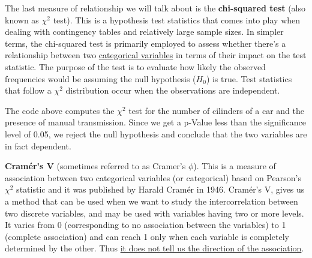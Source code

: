\documentclass[
]{svmono}
\newenvironment{Shaded}{\begin{snugshade}}{\end{snugshade}}
\newcommand{\CommentTok}[1]{\textcolor[rgb]{0.56,0.35,0.01}{\textit{#1}}}
\newcommand{\FunctionTok}[1]{\textcolor[rgb]{0.13,0.29,0.53}{\textbf{#1}}}
\newcommand{\NormalTok}[1]{#1}
\newcommand{\SpecialCharTok}[1]{\textcolor[rgb]{0.81,0.36,0.00}{\textbf{#1}}}
\begin{document}
The last measure of relationship we will talk about is the \textbf{chi-squared
test} (also known as \(\chi^2\) test). This is a hypothesis test
statistics that comes into play when dealing with contingency tables and
relatively large sample sizes. In simpler terms, the chi-squared test is
primarily employed to assess whether there's a relationship between two
\ul{categorical variables} in terms of their impact on the test
statistic. The purpose of the test is to evaluate how likely the
observed frequencies would be assuming the null hypothesis (\(H_0\)) is
true. Test statistics that follow a \(\chi^2\) distribution occur when the
observations are independent.

\begin{Shaded}
\end{Shaded}

The code above computes the \(\chi^2\) test for the number of cilinders of
a car and the presence of manual transmission. Since we get a p-Value
less than the significance level of 0.05, we reject the null hypothesis
and conclude that the two variables are in fact dependent.

\textbf{Cramér's V} (sometimes referred to as Cramer's \(\phi\)). This is a
measure of association between two categorical variables (or
categorical) based on Pearson's \(\chi^2\) statistic and it was published
by Harald Cramér in 1946. Cramér's V, gives us a method that can be used
when we want to study the intercorrelation between two discrete
variables, and may be used with variables having two or more levels. It
varies from 0 (corresponding to no association between the variables) to
1 (complete association) and can reach 1 only when each variable is
completely determined by the other. Thus \ul{it does not tell us the
direction of the association}.

\begin{Shaded}
\end{Shaded}
\end{document}
